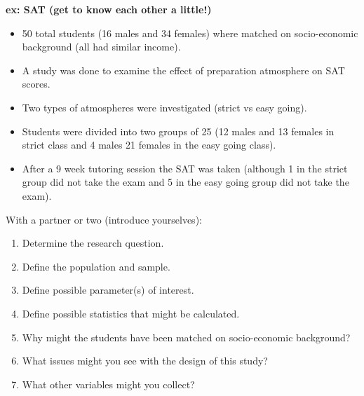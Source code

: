 \newpage

\textbf{ex: SAT (get to know each other a little!)}\\
\begin{itemize}
\item 50 total students (16 males and 34 females) where matched on socio-economic background (all had similar income). 
\item A study was done to examine the effect of preparation atmosphere on SAT scores.  
\item Two types of atmospheres were investigated (strict vs easy going).
\item Students were divided into two groups of 25 (12 males and 13 females in strict class and 4 males 21 females in the easy going class).
\item After a 9 week tutoring session the SAT was taken (although 1 in the strict group did not take the exam and 5 in the easy going group did not take the exam).
\end{itemize}
With a partner or two (introduce yourselves):
\begin{enumerate}
\item Determine the research question.
\item Define the population and sample.
\item Define possible parameter(s) of interest.
\item Define possible statistics that might be calculated.
\item Why might the students have been matched on socio-economic background?
\item What issues might you see with the design of this study?
\item What other variables might you collect?
\end{enumerate}